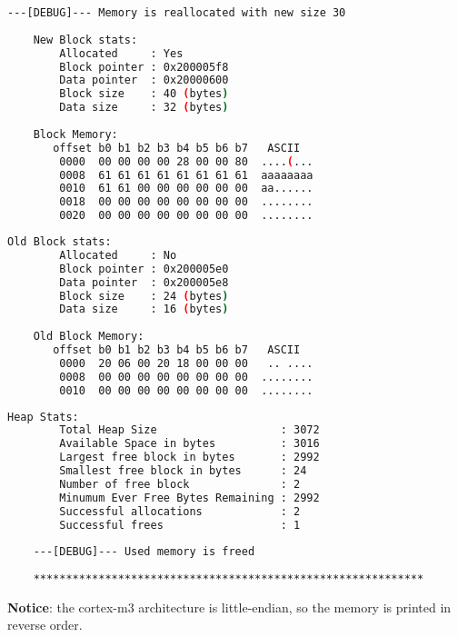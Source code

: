     \begin{outputbox}
    \begin{lstlisting}[language=bash]
    ---[DEBUG]--- Memory is reallocated with new size 30
    
    New Block stats:
        Allocated     : Yes
        Block pointer : 0x200005f8
        Data pointer  : 0x20000600
        Block size    : 40 (bytes)
        Data size     : 32 (bytes)
    
    Block Memory:
       offset b0 b1 b2 b3 b4 b5 b6 b7   ASCII
        0000  00 00 00 00 28 00 00 80  ....(...
        0008  61 61 61 61 61 61 61 61  aaaaaaaa
        0010  61 61 00 00 00 00 00 00  aa......
        0018  00 00 00 00 00 00 00 00  ........
        0020  00 00 00 00 00 00 00 00  ........
    \end{lstlisting}
    \end{outputbox}
    
    \begin{outputbox}
    \begin{lstlisting}[language=bash]
    Old Block stats:
        Allocated     : No
        Block pointer : 0x200005e0
        Data pointer  : 0x200005e8
        Block size    : 24 (bytes)
        Data size     : 16 (bytes)
    
    Old Block Memory:
       offset b0 b1 b2 b3 b4 b5 b6 b7   ASCII
        0000  20 06 00 20 18 00 00 00   .. ....
        0008  00 00 00 00 00 00 00 00  ........
        0010  00 00 00 00 00 00 00 00  ........
    \end{lstlisting}
    \end{outputbox}
    
    \begin{outputbox}
    \begin{lstlisting}[language=bash]
    Heap Stats:
        Total Heap Size                   : 3072
        Available Space in bytes          : 3016
        Largest free block in bytes       : 2992
        Smallest free block in bytes      : 24
        Number of free block              : 2
        Minumum Ever Free Bytes Remaining : 2992
        Successful allocations            : 2
        Successful frees                  : 1
    
    ---[DEBUG]--- Used memory is freed
    
    ************************************************************
    \end{lstlisting}
    \end{outputbox}

    \textbf{Notice}: the cortex-m3 architecture is little-endian, so the memory is printed in reverse order.


